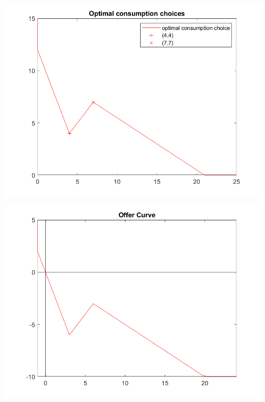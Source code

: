 \documentclass[11pt]{article} %
\begin{document}
\includegraphics{indiff3}

\includegraphics{off3}
%
\end{document}
